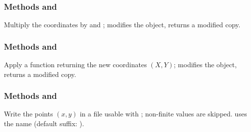 \subsubsection{Methods  and }
\label{ssub:method_pfct_scale}

Multiply the coordinates by  and ;  modifies
the object,  returns a modified copy.

\subsubsection{Methods  and }
\label{ssub:method_pfct_map}

Apply a function  returning the new coordinates $(X, Y)$;
 modifies the object,  returns a modified copy.

\subsubsection{Methods  and }
\label{ssub:method_pfct_file}

Write the points $(x, y)$ in a file usable with ;
non-finite values are skipped.  uses the name
 (default suffix: ).

\endinput
